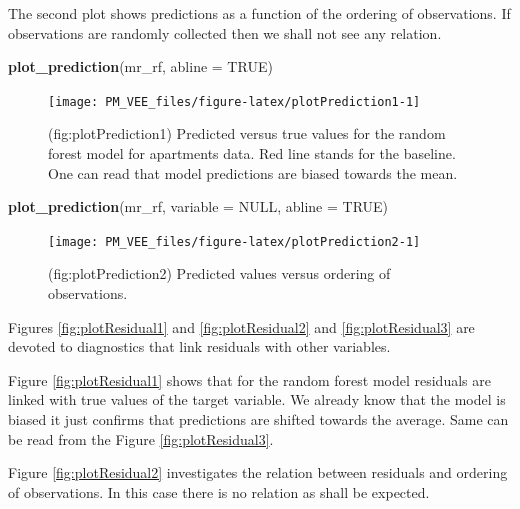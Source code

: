 \documentclass[12pt,]{krantz}
\newenvironment{Shaded}{\begin{snugshade}}{\end{snugshade}}
\newcommand{\DataTypeTok}[1]{\textcolor[rgb]{0.13,0.29,0.53}{#1}}
\newcommand{\KeywordTok}[1]{\textcolor[rgb]{0.13,0.29,0.53}{\textbf{#1}}}
\newcommand{\NormalTok}[1]{#1}
\newcommand{\OtherTok}[1]{\textcolor[rgb]{0.56,0.35,0.01}{#1}}
\begin{document}
The second plot shows predictions as a function of the ordering of observations. If observations are randomly collected then we shall not see any relation.

\begin{Shaded}
\begin{Highlighting}[]
\KeywordTok{plot_prediction}\NormalTok{(mr_rf, }\DataTypeTok{abline =} \OtherTok{TRUE}\NormalTok{)}
\end{Highlighting}
\end{Shaded}

\begin{figure}

{\centering \texttt{[image: PM\_VEE\_files/figure-latex/plotPrediction1-1]} 

}

\caption{(fig:plotPrediction1) Predicted versus true values for the random forest model for apartments data. Red line stands for the baseline. One can read that model predictions are biased towards the mean.}\label{fig:plotPrediction1}
\end{figure}

\begin{Shaded}
\begin{Highlighting}[]
\KeywordTok{plot_prediction}\NormalTok{(mr_rf, }\DataTypeTok{variable =} \OtherTok{NULL}\NormalTok{, }\DataTypeTok{abline =} \OtherTok{TRUE}\NormalTok{)}
\end{Highlighting}
\end{Shaded}

\begin{figure}

{\centering \texttt{[image: PM\_VEE\_files/figure-latex/plotPrediction2-1]} 

}

\caption{(fig:plotPrediction2) Predicted values versus ordering of observations. }\label{fig:plotPrediction2}
\end{figure}

Figures \ref{fig:plotResidual1} and \ref{fig:plotResidual2} and \ref{fig:plotResidual3} are devoted to diagnostics that link residuals with other variables.

Figure \ref{fig:plotResidual1} shows that for the random forest model residuals are linked with true values of the target variable. We already know that the model is biased it just confirms that predictions are shifted towards the average. Same can be read from the Figure \ref{fig:plotResidual3}.

Figure \ref{fig:plotResidual2} investigates the relation between residuals and ordering of observations. In this case there is no relation as shall be expected.
\end{document}
